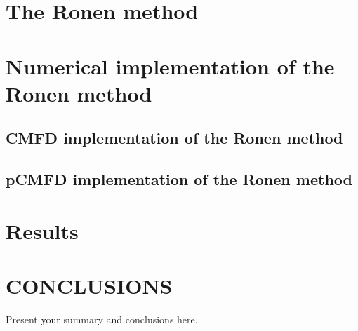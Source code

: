 \documentclass[letterpaper]{physor2020}
\begin{document}
\section{The Ronen method} 
\label{sec:RM}

\section{Numerical implementation of the Ronen method} 
\label{sec:RM-num}

\subsection{CMFD implementation of the Ronen method} 
\label{sec:RM-CMFD}

\subsection{pCMFD implementation of the Ronen method} 
\label{sec:RM-pCMFD}


\section{Results} 
\label{sec:res}


\section{CONCLUSIONS}
\label{sec:conc}

Present your summary and conclusions here.


\end{document}
